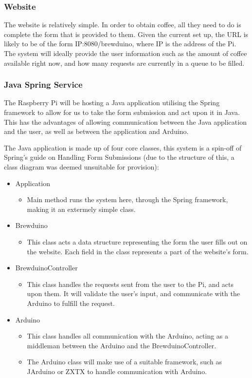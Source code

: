 \documentclass[11pt, a4paper]{article}
\begin{document}
\subsubsection{Website}
The website is relatively simple. In order to obtain coffee, all they need to
do is complete the form that is provided to them. Given the current set up, the
URL is likely to be of the form IP:8080/brewduino, where IP is the address of
the Pi. The system will ideally provide the user information such as the amount
of coffee available right now, and how many requests are currently in a queue to
be filled.

\subsubsection{Java Spring Service}
The Raspberry Pi will be hosting a Java application utilising the Spring
framework to allow for us to take the form submission and act upon it in Java.
This has the advantages of allowing communication between the Java application
and the user, as well as between the application and Arduino.

The Java application is made up of four core classes, this system is a spin-off
of Spring's guide on Handling Form Submissions\cite{SpringGuide} (due to the
structure of this, a class diagram was deemed unsuitable for provision):
\begin{itemize}
	\item Application
	\begin{itemize}
		\item Main method runs the system here, through the Spring framework,
		making it an extermely simple class.
	\end{itemize}
	\item Brewduino
	\begin{itemize}
		\item This class acts a data structure representing the form the user
		fills out on the website. Each field in the class represents a part of
		the website's form.
	\end{itemize}
	\item BrewduinoController
	\begin{itemize}
		\item This class handles the requests sent from the user to the Pi, and
		acts upon them. It will validate the user's input, and communicate with
		the Arduino to fulfill the request.
	\end{itemize}
	\item Arduino
	\begin{itemize}
		\item This class handles all communication with the Arduino, acting as a
		middleman between the Arduino and the BrewduinoController.
		\item The Arduino class will make use of a suitable framework, such as
		JArduino\cite{JArduino} or ZXTX\cite{RXTX} to handle communication with
		Arduino.
	\end{itemize}
\end{itemize}
\newpage
\end{document}
